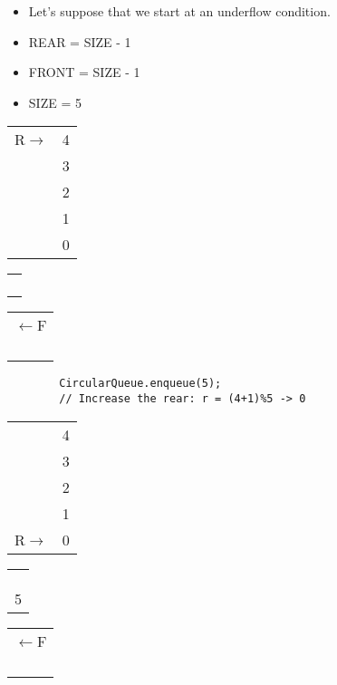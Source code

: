 \begin{center}
    \begin{itemize}
        \item Let's suppose that we start at an underflow condition.
        \item REAR = SIZE - 1 
        \item FRONT = SIZE - 1
        \item SIZE = 5
    \end{itemize}
    \begin{tabular}{ cc }
        {R$\rightarrow$}&{4} \\ {}&{3} \\ {}&{2} \\ {}&{1} \\ {}&{0} \\
    \end{tabular}
    \begin{tabular}{|p{0.75cm}|}
        \hline {} \\ \hline {} \\ \hline {} \\ \hline {} \\ \hline {} \\ \hline
    \end{tabular}
    \begin{tabular}{ c }
        {$\leftarrow$F} \\ {} \\ {} \\ {} \\ {} \\
    \end{tabular}

    \begin{verbatim}
        CircularQueue.enqueue(5);
        // Increase the rear: r = (4+1)%5 -> 0
    \end{verbatim}

    \begin{tabular}{ cc }
        {}&{4} \\ {}&{3} \\ {}&{2} \\ {}&{1} \\ {R$\rightarrow$}&{0} \\
    \end{tabular}
    \begin{tabular}{|p{0.75cm}|}
        \hline {} \\ \hline {} \\ \hline {} \\ \hline {} \\ \hline {5} \\ \hline
    \end{tabular}
    \begin{tabular}{ c }
        {$\leftarrow$F} \\ {} \\ {} \\ {} \\ {} \\
    \end{tabular}


\end{center}
